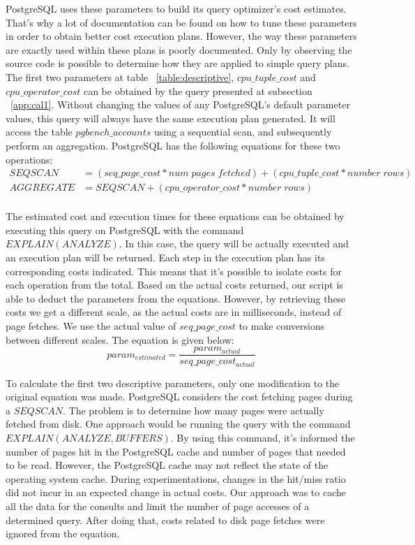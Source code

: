 PostgreSQL uses these parameters to build its query optimizer's cost estimates. That's why a lot of documentation can be found on how to tune these parameters in order to obtain better cost execution plans. However, the way these parameters are exactly used within these plans is poorly documented. Only by observing the source code is possible to determine how they are applied to simple query plans. The first two parameters at table ~\ref{table:descriptive}, $cpu\_tuple\_cost$ and $cpu\_operator\_cost$ can be obtained by the query presented at subsection ~\ref{app:cal1}. Without changing the values of any PostgreSQL's default parameter values, this query will always have the same execution plan generated. It will access the table $pgbench\_accounts$ using a sequential scan, and subsequently perform an aggregation. PostgreSQL has the following equations for these two operations:
\begin{equation}
  \begin{split}
      SEQSCAN &= ( seq\_page\_cost * num\; pages \; fetched ) + ( cpu\_tuple\_cost * number\; rows ) \\
      AGGREGATE &= SEQSCAN + ( cpu\_operator\_cost * number\; rows) \\
  \end{split}
\end{equation}

The estimated cost and execution times for these equations can be obtained by executing this query on PostgreSQL with the command $EXPLAIN (ANALYZE)$. In this case, the query will be actually executed and an execution plan will be returned. Each step in the execution plan has its corresponding costs indicated. This means that it's possible to isolate costs for each operation from the total. Based on the actual costs returned, our script is able to deduct the parameters from the equations. However, by retrieving these costs we get a different scale, as the actual costs are in milliseconds, instead of page fetches. We use the actual value of $seq\_page\_cost$ to make conversions between different scales. The equation is given below:
\[
 param_{estimated} = \frac{param_{actual}}{seq\_page\_cost_{actual}}
\]

To calculate the first two descriptive parameters, only one modification to the original equation was made. PostgreSQL considers the cost fetching pages  during a $SEQSCAN$. The problem is to determine how many pages were actually fetched from disk. One approach would be running the query with the command $EXPLAIN (ANALYZE,BUFFERS)$. By using this command, it's informed the number of pages hit in the PostgreSQL cache and number of pages that needed to be read. However, the PostgreSQL cache may not reflect the state of the operating system cache. During experimentations, changes in the hit/miss ratio did not incur in an expected change in actual costs. Our approach was to cache all the data for the consults and limit the number of page accesses of a determined query. After doing that, costs related to disk page fetches were ignored from the equation.

